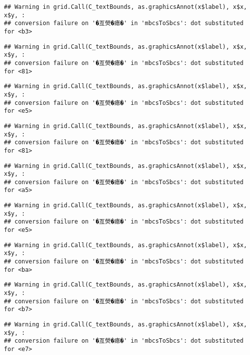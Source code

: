 \documentclass[
]{article}
\begin{document}
\begin{verbatim}
## Warning in grid.Call(C_textBounds, as.graphicsAnnot(x$label), x$x, x$y, :
## conversion failure on '�亙熒�瘜�' in 'mbcsToSbcs': dot substituted for <b3>
\end{verbatim}

\begin{verbatim}
## Warning in grid.Call(C_textBounds, as.graphicsAnnot(x$label), x$x, x$y, :
## conversion failure on '�亙熒�瘜�' in 'mbcsToSbcs': dot substituted for <81>
\end{verbatim}

\begin{verbatim}
## Warning in grid.Call(C_textBounds, as.graphicsAnnot(x$label), x$x, x$y, :
## conversion failure on '�亙熒�瘜�' in 'mbcsToSbcs': dot substituted for <e5>
\end{verbatim}

\begin{verbatim}
## Warning in grid.Call(C_textBounds, as.graphicsAnnot(x$label), x$x, x$y, :
## conversion failure on '�亙熒�瘜�' in 'mbcsToSbcs': dot substituted for <81>
\end{verbatim}

\begin{verbatim}
## Warning in grid.Call(C_textBounds, as.graphicsAnnot(x$label), x$x, x$y, :
## conversion failure on '�亙熒�瘜�' in 'mbcsToSbcs': dot substituted for <a5>
\end{verbatim}

\begin{verbatim}
## Warning in grid.Call(C_textBounds, as.graphicsAnnot(x$label), x$x, x$y, :
## conversion failure on '�亙熒�瘜�' in 'mbcsToSbcs': dot substituted for <e5>
\end{verbatim}

\begin{verbatim}
## Warning in grid.Call(C_textBounds, as.graphicsAnnot(x$label), x$x, x$y, :
## conversion failure on '�亙熒�瘜�' in 'mbcsToSbcs': dot substituted for <ba>
\end{verbatim}

\begin{verbatim}
## Warning in grid.Call(C_textBounds, as.graphicsAnnot(x$label), x$x, x$y, :
## conversion failure on '�亙熒�瘜�' in 'mbcsToSbcs': dot substituted for <b7>
\end{verbatim}

\begin{verbatim}
## Warning in grid.Call(C_textBounds, as.graphicsAnnot(x$label), x$x, x$y, :
## conversion failure on '�亙熒�瘜�' in 'mbcsToSbcs': dot substituted for <e7>
\end{verbatim}
\end{document}
